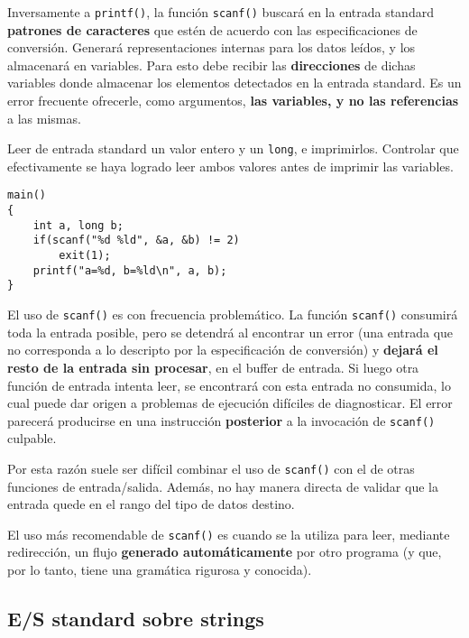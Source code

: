 Inversamente a \lstinline{printf()}, la función \lstinline{scanf()} buscará en la entrada standard
\textbf{patrones de caracteres} que estén de acuerdo con las especificaciones de conversión. Generará
representaciones internas para los datos leídos, y los almacenará en variables.
Para esto debe recibir las \textbf{direcciones} de dichas variables donde almacenar los
elementos detectados en la entrada standard. Es un error frecuente ofrecerle,
como argumentos, \textbf{las variables, y no las referencias} a las mismas.


\begin{ejemplo}
Leer de entrada standard un valor entero y un \lstinline{long}, e imprimirlos. Controlar que efectivamente se haya logrado leer ambos valores antes de imprimir las variables.
\begin{lstlisting}
main() 
{
    int a, long b;
    if(scanf("%d %ld", &a, &b) != 2)
        exit(1);
    printf("a=%d, b=%ld\n", a, b);
}
\end{lstlisting}
\end{ejemplo}


El uso de \lstinline{scanf()} es con frecuencia problemático. La función \lstinline{scanf()} consumirá
toda la entrada posible, pero se detendrá al encontrar un error (una entrada
que no corresponda a lo descripto por la especificación de conversión) y \textbf{dejará
el resto de la entrada sin procesar}, en el buffer de entrada. Si luego otra
función de entrada intenta leer, se encontrará con esta entrada no consumida,
lo cual puede dar origen a problemas de ejecución difíciles de diagnosticar. El
error parecerá producirse en una instrucción \textbf{posterior} a la invocación de \lstinline{scanf()} culpable. 

Por esta razón suele ser difícil combinar el uso de \lstinline{scanf()} con el de 
otras funciones de entrada/salida. Además, no hay manera directa de validar que
la entrada quede en el rango del tipo de datos destino.

El uso más recomendable de \lstinline{scanf()} es cuando se la utiliza para leer, mediante
redirección, un flujo \textbf{generado automáticamente} por otro programa (y que, por lo
tanto, tiene una gramática rigurosa y conocida).

\subsection{E/S standard sobre strings}
\label{subsec:esstandardstrings}

